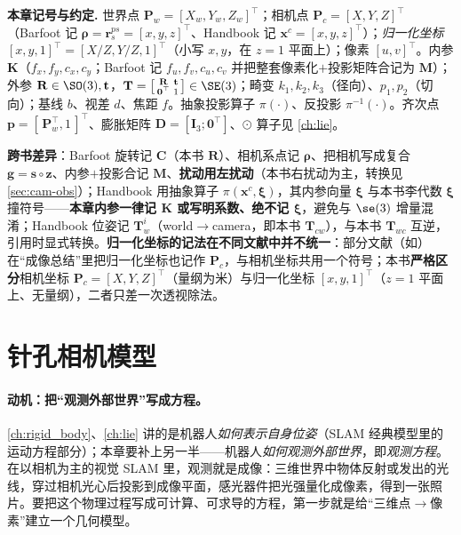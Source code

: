 \begin{note}
\textbf{本章记号与约定.}\;
世界点 $\mathbf{P}_w=[X_w,Y_w,Z_w]^\top$；相机点 $\mathbf{P}_c=[X,Y,Z]^\top$（Barfoot\cite{barfoot2024state} 记 $\boldsymbol\rho=\mathbf{r}_s^{ps}=[x,y,z]^\top$、Handbook\cite{carlone2026handbook} 记 $\mathbf{x}^c=[x,y,z]^\top$）；\emph{归一化坐标} $[x,y,1]^\top=[X/Z,Y/Z,1]^\top$（小写 $x,y$，在 $z=1$ 平面上）；像素 $[u,v]^\top$。内参 $\mathbf{K}$（$f_x,f_y,c_x,c_y$；Barfoot 记 $f_u,f_v,c_u,c_v$ 并把整套像素化$+$投影矩阵合记为 $\mathbf{M}$）；外参 $\mathbf{R}\in\SO(3),\mathbf{t}$，$\mathbf{T}=\big[\begin{smallmatrix}\mathbf{R}&\mathbf{t}\\\mathbf{0}^\top&1\end{smallmatrix}\big]\in\SE(3)$；畸变 $k_1,k_2,k_3$（径向）、$p_1,p_2$（切向）；基线 $b$、视差 $d$、焦距 $f$。抽象投影算子 $\pi(\cdot)$、反投影 $\pi^{-1}(\cdot)$。齐次点 $\mathbf{p}=[\,\mathbf{P}_w^\top,1\,]^\top$、膨胀矩阵 $\mathbf{D}=[\mathbf{I}_3;\mathbf{0}^\top]$、$\odot$ 算子见 \cref{ch:lie}。

\textbf{跨书差异}：Barfoot\cite{barfoot2024state} 旋转记 $\mathbf{C}$（本书 $\mathbf{R}$）、相机系点记 $\boldsymbol\rho$、把相机写成复合 $\mathbf{g}=\mathbf{s}\circ\mathbf{z}$、内参$+$投影合记 $\mathbf{M}$、\textbf{扰动用左扰动}（本书右扰动为主，转换见 \cref{sec:cam-obs}）；Handbook\cite{carlone2026handbook} 用抽象算子 $\pi(\mathbf{x}^c,\boldsymbol\xi)$，其内参向量 $\boldsymbol\xi$ 与本书李代数 $\boldsymbol{\xi}$ 撞符号——\textbf{本章内参一律记 $\mathbf{K}$ 或写明系数、绝不记 $\boldsymbol\xi$}，避免与 $\se(3)$ 增量混淆；Handbook 位姿记 $\mathbf{T}_w^i$（world$\to$camera，即本书 $\mathbf{T}_{cw}$），与本书 $\mathbf{T}_{wc}$ 互逆，引用时显式转换。\textbf{归一化坐标的记法在不同文献中并不统一}：部分文献（如\cite{gaoxiang2019slam14}）在“成像总结”里把归一化坐标也记作 $\mathbf{P}_c$，与相机坐标共用一个符号；本书\textbf{严格区分}相机坐标 $\mathbf{P}_c=[X,Y,Z]^\top$（量纲为米）与归一化坐标 $[x,y,1]^\top$（$z=1$ 平面上、无量纲），二者只差一次透视除法。
\end{note}

\section{针孔相机模型}
\label{sec:cam-pinhole}

\paragraph{动机：把“观测外部世界”写成方程。}
\cref{ch:rigid_body}、\cref{ch:lie} 讲的是机器人\emph{如何表示自身位姿}（SLAM 经典模型里的运动方程部分）；本章要补上另一半——机器人\emph{如何观测外部世界}\cite{gaoxiang2019slam14}，即\emph{观测方程}。在以相机为主的视觉 SLAM 里，观测就是成像：三维世界中物体反射或发出的光线，穿过相机光心后投影到成像平面，感光器件把光强量化成像素，得到一张照片。要把这个物理过程写成可计算、可求导的方程，第一步就是给“三维点$\to$像素”建立一个几何模型。


